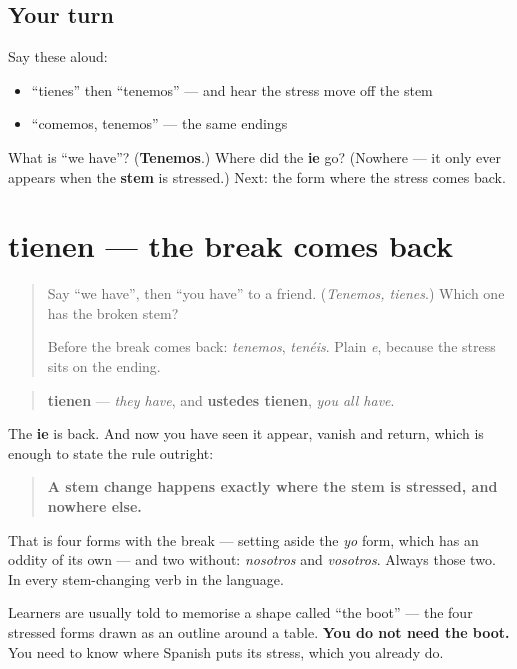 \subsection*{Your turn}
Say these aloud:

\begin{itemize}
\raggedright
  \item \textquotedblleft{}tienes\textquotedblright{} then \textquotedblleft{}tenemos\textquotedblright{} — and hear the stress move off the stem
  \item \textquotedblleft{}comemos, tenemos\textquotedblright{} — the same endings
\end{itemize}

\begin{tcolorbox}[breakable,colback=teal!4,colframe=teal!35!black,title={Before you move on}]
What is \textquotedblleft{}we have\textquotedblright{}? (\textbf{Tenemos}.) Where did the \textbf{ie} go? (Nowhere — it only ever appears when the \textbf{stem} is stressed.) Next: the form where the stress comes back.
\end{tcolorbox}
\section[tienen]{tienen — the break comes back}

\label{lesson:ES-C08-tienen}



\begin{quote}
Say \textquotedblleft{}we have\textquotedblright{}, then \textquotedblleft{}you have\textquotedblright{} to a friend. (\emph{Tenemos, tienes}.) Which one has the broken stem?

Before the break comes back: \emph{tenemos}, \emph{tenéis}. Plain \emph{e}, because the stress sits on the ending.
\end{quote}

\begin{grammarlens}[title={Grammar Lens: the rule, stated once and for all}]
\begin{quote}
\textbf{tienen} — \emph{they have}, and \textbf{ustedes tienen}, \emph{you all have}.
\end{quote}

The \textbf{ie} is back. And now you have seen it appear, vanish and return, which is enough to state the rule outright:

\begin{quote}
\textbf{A stem change happens exactly where the stem is stressed, and nowhere else.}
\end{quote}

That is four forms with the break — setting aside the \emph{yo} form, which has an oddity of its own — and two without: \emph{nosotros} and \emph{vosotros}. Always those two. In every stem-changing verb in the language.

Learners are usually told to memorise a shape called \textquotedblleft{}the boot\textquotedblright{} — the four stressed forms drawn as an outline around a table. \textbf{You do not need the boot.} You need to know where Spanish puts its stress, which you already do.
\end{grammarlens}

